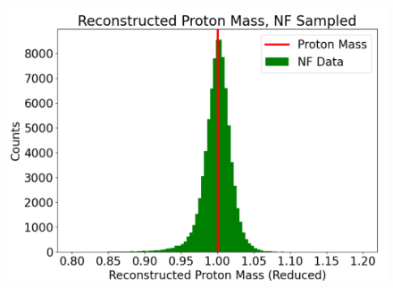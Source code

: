 \begin{figure}[!h]
    \centering
    

    \label{fig:protons}
\end{figure}



\begin{figure}[!ht]
    \centering
     \begin{minipage}{0.2349\textwidth}
        \centering
        \includegraphics[width=.97\textwidth,trim={ 0 0 0 0},clip]{Chapters/Ch3-Simulations/normalizing_flows/pics/FinalPictures/updated_proton_reduced.png}

    \end{minipage}
    \begin{minipage}{0.21245\textwidth}
        \centering
        

\end{minipage}
\end{figure}
